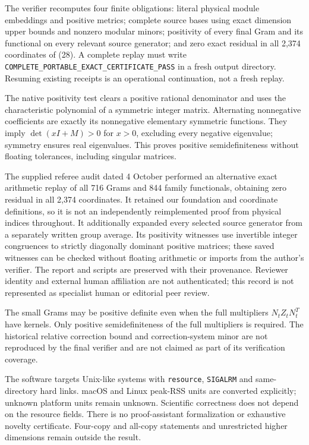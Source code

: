 \documentclass[
  11pt,
]{article}
\begin{document}
The verifier recomputes four finite obligations: literal physical module
embeddings and positive metrics; complete source bases using exact
dimension upper bounds and nonzero modular minors; positivity of every
final Gram and its functional on every relevant source generator; and
zero exact residual in all 2,374 coordinates of (28). A complete replay
must write \texttt{COMPLETE\_PORTABLE\_EXACT\_CERTIFICATE\_PASS} in a
fresh output directory. Resuming existing receipts is an operational
continuation, not a fresh replay.

The native positivity test clears a positive rational denominator and
uses the characteristic polynomial of a symmetric integer matrix.
Alternating nonnegative coefficients are exactly its nonnegative
elementary symmetric functions. They imply \(\det(xI+M)>0\) for \(x>0\),
excluding every negative eigenvalue; symmetry ensures real eigenvalues.
This proves positive semidefiniteness without floating tolerances,
including singular matrices.

The supplied referee audit dated 4 October performed an alternative
exact arithmetic replay of all 716 Grams and 844 family functionals,
obtaining zero residual in all 2,374 coordinates. It retained our
foundation and coordinate definitions, so it is not an independently
reimplemented proof from physical indices throughout. It additionally
expanded every selected source generator from a separately written group
average. Its positivity witnesses use invertible integer congruences to
strictly diagonally dominant positive matrices; these saved witnesses
can be checked without floating arithmetic or imports from the author's
verifier. The report and scripts are preserved with their provenance.
Reviewer identity and external human affiliation are not authenticated;
this record is not represented as specialist human or editorial peer
review.

The small Grams may be positive definite even when the full multipliers
\(N_tZ_tN_t^T\) have kernels. Only positive semidefiniteness of the full
multipliers is required. The historical relative correction bound and
correction-system minor are not reproduced by the final verifier and are
not claimed as part of its verification coverage.

The software targets Unix-like systems with \texttt{resource},
\texttt{SIGALRM} and same-directory hard links. macOS and Linux peak-RSS
units are converted explicitly; unknown platform units remain unknown.
Scientific correctness does not depend on the resource fields. There is
no proof-assistant formalization or exhaustive novelty certificate.
Four-copy and all-copy statements and unrestricted higher dimensions
remain outside the result.
\end{document}
